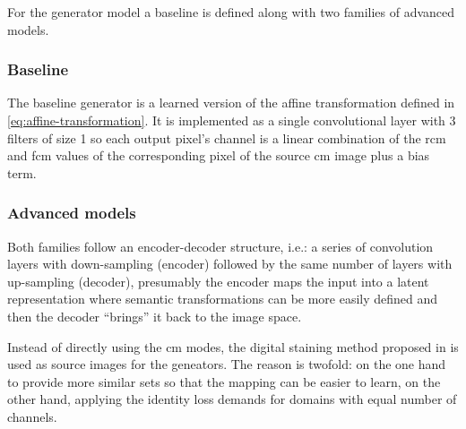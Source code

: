 \documentclass[../main.tex]{subfiles}
\begin{document}
For the generator model a baseline is defined along with two families of
advanced models.

\subsubsection{Baseline}\label{sec:stain-baseline}
The baseline generator is a learned version of the affine transformation
defined in \eqref{eq:affine-transformation}.
It is implemented as a single convolutional layer
with 3 filters of size 1 so each output pixel's channel is a linear combination
of the \gls{rcm} and \gls{fcm} values of the corresponding pixel of the
source \gls{cm} image plus a bias term.

\subsubsection{Advanced models}
Both families follow an encoder-decoder
structure, i.e.: a series of convolution layers with down-sampling (encoder)
followed by the same number of layers with up-sampling\footnotemark{} (decoder),
presumably the encoder maps the input into a latent representation where
semantic transformations can be more easily defined and then the decoder
``brings'' it back to the image space.

Instead of directly using the \gls{cm} modes, the digital staining
method proposed in \cite{Gareau2009} is used as source images for the geneators.
The reason is twofold: on the one hand to provide more similar sets so that
the mapping can be easier to learn, on the other hand, applying the
identity loss demands for domains with equal number of channels.
\end{document}
